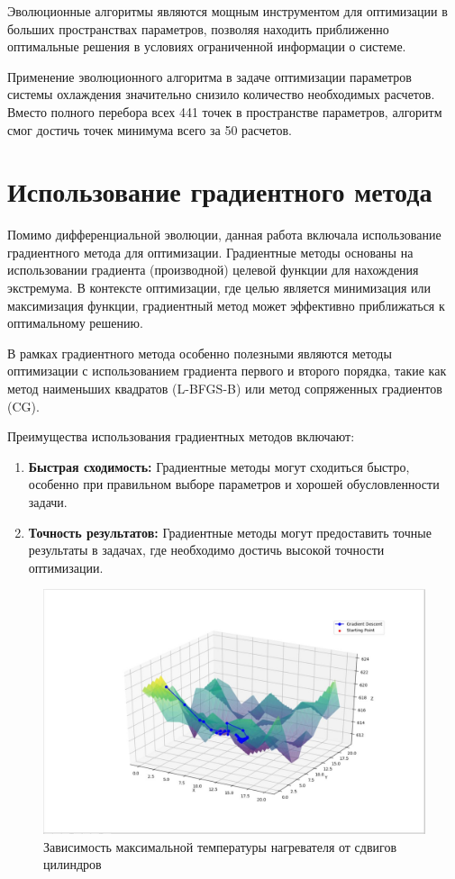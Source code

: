 \documentclass[a4paper,12pt]{article}
\theoremstyle{plain} %
\theoremstyle{definition} %
\theoremstyle{remark} %
\begin{document}
Эволюционные алгоритмы являются мощным инструментом для оптимизации в больших пространствах параметров, позволяя находить приближенно оптимальные решения в условиях ограниченной информации о системе.

Применение эволюционного алгоритма в задаче оптимизации параметров системы охлаждения значительно снизило количество необходимых расчетов. Вместо полного перебора всех 441 точек в пространстве параметров, алгоритм смог достичь точек минимума всего за 50 расчетов.

\section{Использование градиентного метода}

Помимо дифференциальной эволюции,  данная работа включала использование градиентного метода для оптимизации. Градиентные методы основаны на использовании градиента (производной) целевой функции для нахождения экстремума. В контексте оптимизации, где целью является минимизация или максимизация функции, градиентный метод может эффективно приближаться к оптимальному решению.

В рамках градиентного метода особенно полезными являются методы оптимизации с использованием градиента первого и второго порядка, такие как метод наименьших квадратов (L-BFGS-B) или метод сопряженных градиентов (CG).

Преимущества использования градиентных методов включают:

\begin{enumerate}
    \item \textbf{Быстрая сходимость:} Градиентные методы могут сходиться быстро, особенно при правильном выборе параметров и хорошей обусловленности задачи.

    \item \textbf{Точность результатов:} Градиентные методы могут предоставить точные результаты в задачах, где необходимо достичь высокой точности оптимизации.
\end{enumerate}

\begin{figure}[h]
	\begin{center}
		\includegraphics[width=0.4\linewidth]{24.jpg}
		\caption{Зависимость максимальной температуры нагревателя от сдвигов цилиндров} %
	\end{center}
\end{figure}
\end{document}

